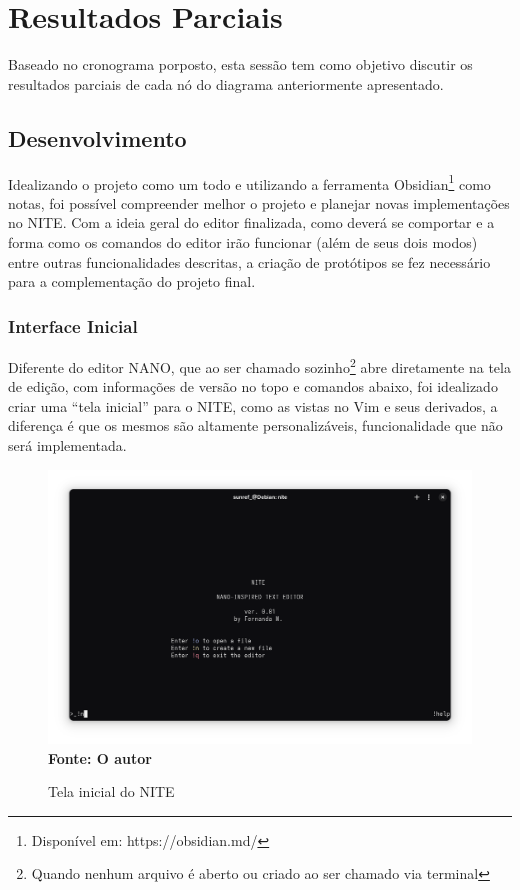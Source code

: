 \chapter{Resultados Parciais}
\label{cap:04}

Baseado no cronograma porposto, esta sessão tem como objetivo discutir os resultados parciais de cada nó do diagrama anteriormente
apresentado.

\section{Desenvolvimento}

Idealizando o projeto como um todo e utilizando a ferramenta Obsidian\footnote{Disponível em: https://obsidian.md/} como notas, foi possível
compreender melhor o projeto e planejar novas implementações no NITE. Com a ideia geral do editor finalizada, como deverá se comportar e a forma
como os comandos do editor irão funcionar (além de seus dois modos) entre outras funcionalidades descritas, a criação de protótipos se fez necessário
para a complementação do projeto final.

\subsection{Interface Inicial}

Diferente do editor NANO, que ao ser chamado sozinho\footnote{Quando nenhum arquivo é aberto ou criado ao ser chamado via terminal}
abre diretamente na tela de edição, com informações de versão no topo e comandos abaixo, foi idealizado criar uma ``tela inicial'' para o NITE,
como as vistas no Vim e seus derivados, a diferença é que os mesmos são altamente personalizáveis, funcionalidade que não será implementada.

\FloatBarrier
\begin{figure}[!htbp]
    \centering
    \caption{Tela inicial do NITE}
    \includegraphics[scale=0.3]{imagens/NITE.png}
    \\\textbf{Fonte: O autor} \label{fig:NITE}
\end{figure}
\FloatBarrier


